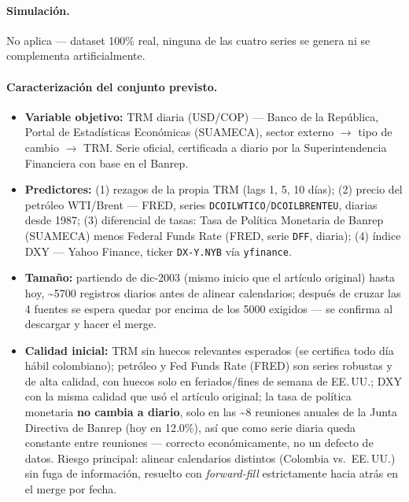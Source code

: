 \documentclass[11pt,letterpaper]{article}
\begin{document}
  \paragraph{Simulación.} No aplica --- dataset 100\% real, ninguna de las cuatro series se genera ni se complementa artificialmente.

  \paragraph{Caracterización del conjunto previsto.}
  \begin{itemize}[leftmargin=1.2em]
    \item \textbf{Variable objetivo:} TRM diaria (USD/COP) --- Banco de la República, Portal de Estadísticas Económicas (SUAMECA), sector externo $\rightarrow$ tipo de cambio $\rightarrow$ TRM. Serie oficial, certificada a diario por la Superintendencia Financiera con base en el Banrep.
    \item \textbf{Predictores:} (1) rezagos de la propia TRM (lags 1, 5, 10 días); (2) precio del petróleo WTI/Brent --- FRED, series \texttt{DCOILWTICO}/\texttt{DCOILBRENTEU}, diarias desde 1987; (3) diferencial de tasas: Tasa de Política Monetaria de Banrep (SUAMECA) menos Federal Funds Rate (FRED, serie \texttt{DFF}, diaria); (4) índice DXY --- Yahoo Finance, ticker \texttt{DX-Y.NYB} vía \texttt{yfinance}.
    \item \textbf{Tamaño:} partiendo de dic-2003 (mismo inicio que el artículo original) hasta hoy, \textasciitilde5700 registros diarios antes de alinear calendarios; después de cruzar las 4 fuentes se espera quedar por encima de los 5000 exigidos --- se confirma al descargar y hacer el merge.
    \item \textbf{Calidad inicial:} TRM sin huecos relevantes esperados (se certifica todo día hábil colombiano); petróleo y Fed Funds Rate (FRED) son series robustas y de alta calidad, con huecos solo en feriados/fines de semana de EE.\,UU.; DXY con la misma calidad que usó el artículo original; la tasa de política monetaria \textbf{no cambia a diario}, solo en las \textasciitilde8 reuniones anuales de la Junta Directiva de Banrep (hoy en 12.0\%), así que como serie diaria queda constante entre reuniones --- correcto económicamente, no un defecto de datos. Riesgo principal: alinear calendarios distintos (Colombia vs.\ EE.\,UU.) sin fuga de información, resuelto con \textit{forward-fill} estrictamente hacia atrás en el merge por fecha.
  \end{itemize}
\end{document}
